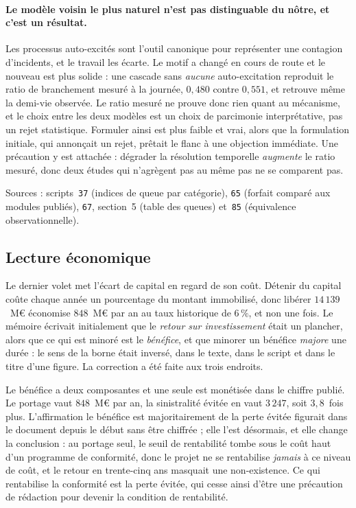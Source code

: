 \documentclass[12pt,a4paper]{article}
\theoremstyle{definition}
\begin{document}
\paragraph{Le modèle voisin le plus naturel n'est pas distinguable du nôtre, et
c'est un résultat.} Les processus auto-excités sont l'outil canonique pour
représenter une contagion d'incidents, et le travail les écarte. Le motif a changé
en cours de route et le nouveau est plus solide : une cascade sans \emph{aucune}
auto-excitation reproduit le ratio de branchement mesuré à la journée, $0{,}480$
contre $0{,}551$, et retrouve même la demi-vie observée. Le ratio mesuré ne prouve
donc rien quant au mécanisme, et le choix entre les deux modèles est un choix de
parcimonie interprétative, pas un rejet statistique. Formuler ainsi est plus faible
et vrai, alors que la formulation initiale, qui annonçait un rejet, prêtait le flanc
à une objection immédiate. Une précaution y est attachée : dégrader la résolution
temporelle \emph{augmente} le ratio mesuré, donc deux études qui n'agrègent pas au
même pas ne se comparent pas.

\vspace{4pt}
\noindent Sources : scripts~\texttt{37} (indices de queue par catégorie),
\texttt{65} (forfait comparé aux modules publiés), \texttt{67}, section~5 (table
des queues) et~\texttt{85} (équivalence observationnelle).

\subsection{Lecture économique}
\label{ss:economique}

Le dernier volet met l'écart de capital en regard de son coût. Détenir du capital
coûte chaque année un pourcentage du montant immobilisé, donc libérer
$14\,139$~M\euro{} économise $848$~M\euro{} par an au taux historique de $6\,\%$,
et non une fois. Le mémoire écrivait initialement que le \emph{retour sur
investissement} était un plancher, alors que ce qui est minoré est le
\emph{bénéfice}, et que minorer un bénéfice \emph{majore} une durée : le sens de la
borne était inversé, dans le texte, dans le script et dans le titre d'une figure.
La correction a été faite aux trois endroits.

Le bénéfice a deux composantes et une seule est monétisée dans le chiffre publié.
Le portage vaut $848$~M\euro{} par an, la sinistralité évitée en vaut $3\,247$, soit
$3{,}8$~fois plus. L'affirmation \og{}le bénéfice est majoritairement de la perte
évitée\fg{} figurait dans le document depuis le début sans être chiffrée ; elle
l'est désormais, et elle change la conclusion : au portage seul, le seuil de
rentabilité tombe sous le coût haut d'un programme de conformité, donc le projet ne
se rentabilise \emph{jamais} à ce niveau de coût, et le \og{}retour en trente-cinq
ans\fg{} masquait une non-existence. Ce qui rentabilise la conformité est la perte
évitée, qui cesse ainsi d'être une précaution de rédaction pour devenir la
condition de rentabilité.
\end{document}
